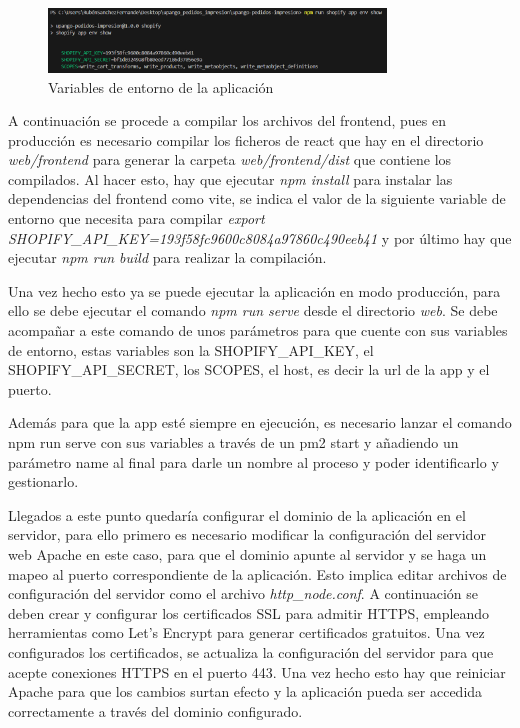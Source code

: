\documentclass[12pt]{article}
\begin{document}
\begin{figure}[ht]
    \centering
    \includegraphics[width=0.8\textwidth]{imagenes/variablesEntornoDespliegue.png}
    \caption{\label{fig:VariablesEntorno}Variables de entorno de la aplicación}
    \vspace{\fill}
\end{figure}

A continuación se procede a compilar los archivos del frontend, pues en producción es necesario compilar los ficheros de react que hay en el directorio \textit{web/frontend} 
para generar la carpeta \textit{web/frontend/dist} que contiene los compilados. Al hacer esto, hay que ejecutar \textit{npm install} para instalar las dependencias del frontend como vite,
se indica el valor de la siguiente variable de entorno que necesita para compilar \textit{export SHOPIFY\_API\_KEY=193f58fc9600c8084a97860c490eeb41} y por último hay que ejecutar \textit{npm run build} para realizar
la compilación.

Una vez hecho esto ya se puede ejecutar la aplicación en modo producción, para ello se debe ejecutar el comando \textit{npm run serve} desde el directorio \textit{web}. Se debe acompañar
a este comando de unos parámetros para que cuente con sus variables de entorno, estas variables son la SHOPIFY\_API\_KEY, el SHOPIFY\_API\_SECRET, los SCOPES,  el host, es decir la url de la app y el puerto.

Además para que la app esté siempre en ejecución, es necesario lanzar el comando npm run serve con sus variables a través de un pm2 start y añadiendo un parámetro name al final para
darle un nombre al proceso y poder identificarlo y gestionarlo. 

Llegados a este punto quedaría configurar el dominio de la aplicación en el servidor, para ello primero es necesario modificar la configuración del servidor web Apache en este caso, para que 
el dominio apunte al servidor y se haga un mapeo al puerto correspondiente de la aplicación. Esto implica editar archivos de configuración del servidor como el archivo \textit{http\_node.conf}. 
A continuación se deben crear y configurar los certificados SSL para admitir HTTPS, empleando herramientas como Let's Encrypt para generar certificados gratuitos. Una vez configurados los
certificados, se actualiza la configuración del servidor para que acepte conexiones HTTPS en el puerto 443. Una vez hecho esto hay que reiniciar Apache para que los cambios surtan
efecto y la aplicación pueda ser accedida correctamente a través del dominio configurado.
\end{document}

